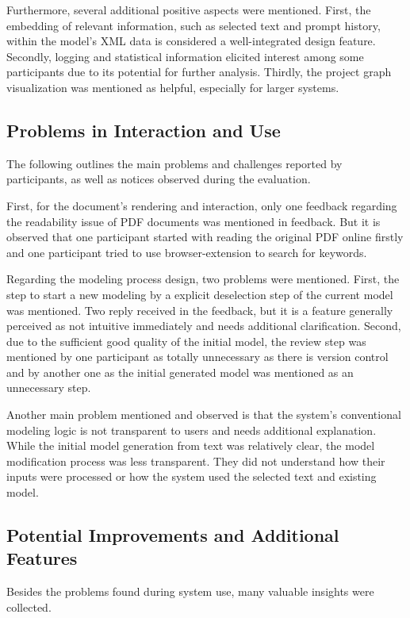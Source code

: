 Furthermore, several additional positive aspects were mentioned. First, the embedding of relevant information, such as selected text and prompt history, within the model's XML data is considered a well-integrated design feature. Secondly, logging and statistical information elicited interest among some participants due to its potential for further analysis. Thirdly, the project graph visualization was mentioned as helpful, especially for larger systems.

\subsection{Problems in Interaction and Use}
The following outlines the main problems and challenges reported by participants, as well as notices observed during the evaluation.

First, for the document's rendering and interaction, only one feedback regarding the readability issue of PDF documents was mentioned in feedback. But it is observed that one participant started with reading the original PDF online firstly and one participant tried to use browser-extension to search for keywords.

Regarding the modeling process design, two problems were mentioned. First, the step to start a new modeling by a explicit deselection step of the current model was mentioned. Two reply received in the feedback, but it is a feature generally perceived as not intuitive immediately and needs additional clarification. Second, due to the sufficient good quality of the initial model, the review step was mentioned by one participant as totally unnecessary as there is version control and by another one as the initial generated model was mentioned as an unnecessary step.

Another main problem mentioned and observed is that the system's conventional modeling logic is not transparent to users and needs additional explanation. While the initial model generation from text was relatively clear, the model modification process was less transparent. They did not understand how their inputs were processed or how the system used the selected text and existing model. 
 
\subsection{Potential Improvements and Additional Features}
Besides the problems found during system use, many valuable insights were collected. 


